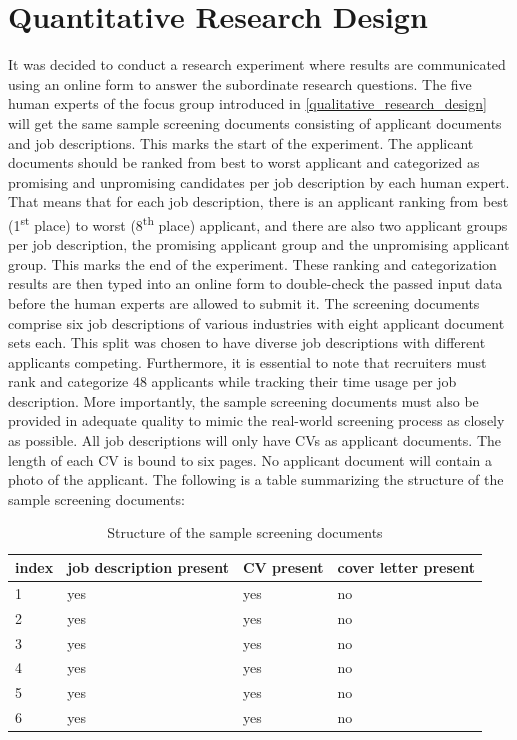 \documentclass[draft,final]{thesisclass} %
\begin{document}
\section{Quantitative Research Design} \label{quantitative_research_design}
It was decided to conduct a research experiment where results are communicated using an online form to answer the subordinate research questions.
The five human experts of the focus group introduced in \ref{qualitative_research_design} will get the same sample screening documents consisting of applicant documents and job descriptions.
This marks the start of the experiment.
The applicant documents should be ranked from best to worst applicant and categorized as promising and unpromising candidates per job description by each human expert.
That means that for each job description, there is an applicant ranking from best (1\textsuperscript{st} place) to worst (8\textsuperscript{th} place) applicant, and there are also two applicant groups per job description, the promising applicant group and the unpromising applicant group.
This marks the end of the experiment.
These ranking and categorization results are then typed into an online form to double-check the passed input data before the human experts are allowed to submit it.
The screening documents comprise six job descriptions of various industries with eight applicant document sets each.
This split was chosen to have diverse job descriptions with different applicants competing.
Furthermore, it is essential to note that recruiters must rank and categorize $48$ applicants while tracking their time usage per job description.
More importantly, the sample screening documents must also be provided in adequate quality to mimic the real-world screening process as closely as possible.
All job descriptions will only have \acs{CV}s as applicant documents.
The length of each \acs{CV} is bound to six pages.
No applicant document will contain a photo of the applicant.
The following is a table summarizing the structure of the sample screening documents:
\begin{table}[H]
    \begin{tabular}{|l|l|l|l|}
    \hline
    \textbf{index} & \textbf{job description present} & \textbf{\acs{CV} present} & \textbf{cover letter present} \\ \hline
    1 & yes & yes & no \\ \hline
    2 & yes & yes & no \\ \hline
    3 & yes & yes & no \\ \hline
    4 & yes & yes & no \\ \hline
    5 & yes & yes & no \\ \hline
    6 & yes & yes & no \\ \hline
    \end{tabular}
    \caption{Structure of the sample screening documents}
\end{table}
\end{document}
